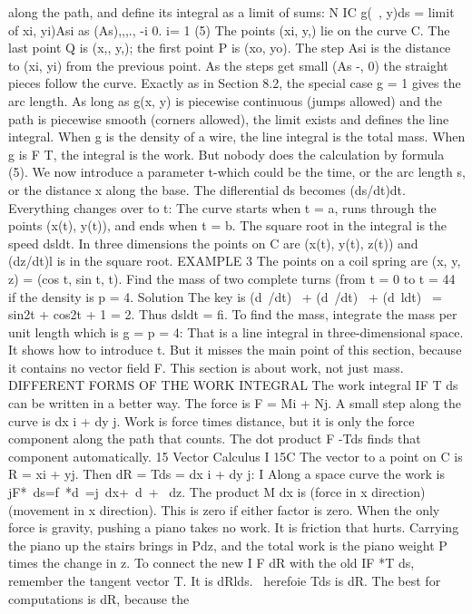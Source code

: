 along the path, and define its integral as a limit of sums:
N IC g(~, y)ds = limit of xi, yi)Asi as (As),,,., -i 0.
i= 1 (5)
The points (xi, y,) lie on the curve C. The last point Q is (x,, y,); the first point P is
(xo, yo). The step Asi is the distance to (xi, yi) from the previous point. As the steps
get small (As -, 0) the straight pieces follow the curve. Exactly as in Section 8.2, the
special case g = 1 gives the arc length. As long as g(x, y) is piecewise continuous
(jumps allowed) and the path is piecewise smooth (corners allowed), the limit exists
and defines the line integral.
When g is the density of a wire, the line integral is the total mass. When g is F T,
the integral is the work. But nobody does the calculation by formula (5). We now
introduce a parameter t-which could be the time, or the arc length s, or the distance
x along the base.
The diflerential ds becomes (ds/dt)dt. Everything changes over to t:
The curve starts when t = a, runs through the points (x(t), y(t)), and ends when t = b.
The square root in the integral is the speed dsldt. In three dimensions the points on
C are (x(t), y(t), z(t)) and (dz/dt)l is in the square root.
EXAMPLE 3 The points on a coil spring are (x, y, z) = (cos t, sin t, t). Find the mass
of two complete turns (from t = 0 to t = 44 if the density is p = 4.
Solution The key is (d~/dt)~ + (d~/dt)~ + (d~ldt)~ = sin2t + cos2t + 1 = 2. Thus
dsldt = fi. To find the mass, integrate the mass per unit length which is g = p = 4:
That is a line integral in three-dimensional space. It shows how to introduce t. But
it misses the main point of this section, because it contains no vector field F. This
section is about work, not just mass.
DIFFERENT FORMS OF THE WORK INTEGRAL
The work integral IF T ds can be written in a better way. The force is F = Mi + Nj.
A small step along the curve is dx i + dy j. Work is force times distance, but it is only
the force component along the path that counts. The dot product F -Tds finds that
component automatically. 
15 Vector Calculus
I 15C The vector to a point on C is R = xi + yj. Then dR = Tds = dx i + dy j:
I Along a space curve the work is jF*~ds=f~*d~=j~dx+~d~+ ~dz.
The product M dx is (force in x direction)(movement in x direction). This is zero if
either factor is zero. When the only force is gravity, pushing a piano takes no work.
It is friction that hurts. Carrying the piano up the stairs brings in Pdz, and the total
work is the piano weight P times the change in z.
To connect the new I F dR with the old IF *T ds, remember the tangent vector
T. It is dRlds. ~herefoie Tds is dR. The best for computations is dR, because the
